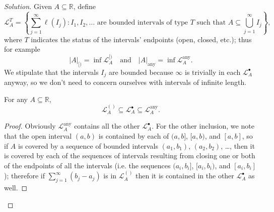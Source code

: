 \documentclass[11pt]{article}
\providecommand{\RR}{\mathbb R}
\newenvironment{soln}{\begin{proof}[Solution]}{\end{proof}}
\providecommand{\abs}[1]{\left|#1\right|}
\begin{document}
\begin{soln}
    Given $A\subseteq\RR$, define
    \begin{equation*}
	\mathcal L_A^{T} = \left\{ \sum_{j=1}^\infty \ell(I_j) :
	I_1, I_2, \dots \text{ are bounded intervals of type $T$ such that }
        A\subseteq\bigcup_{j=1}^\infty I_j\right\},
    \end{equation*}
    where $T$ indicates the status of the intervals' endpoints
    (open, closed, etc.); thus for example
    \begin{equation*}
	\abs{A}_{[)} = \inf\mathcal L_A^{[)}
	\quad\text{and}\quad
	\abs{A}_{\text{any}} = \inf\mathcal L_A^{\text{any}}.
    \end{equation*}
    We stipulate that the intervals $I_j$ are bounded
    because $\infty$ is trivially in each $\mathcal L_A^\bullet$ anyway,
    so we don't need to concern ourselves with intervals of infinite length.
    
    \begin{claim}
        \label{claim:om-ineqs}
	For any $A\subseteq\RR$,
	\begin{equation*}
	    \mathcal L_A^{()}\subseteq
	    \mathcal L_A^{\bullet}\subseteq\mathcal L_A^{\text{any}}.
	\end{equation*}
    \end{claim}

    \begin{proof}
	Obviously $\mathcal L_A^{\text{any}}$ contains
	all the other $\mathcal L_A^\bullet$.
	For the other inclusion, we note that the open interval $(a,b)$
	is contained by each of $(a,b]$, $[a,b)$, and $[a,b]$, so
	if $A$ is covered by a sequence of bounded intervals
	$(a_1, b_1)$, $(a_2, b_2)$, \dots, then
	it is covered by each of the sequences of intervals resulting from
	closing one or both of the endpoints of all the intervals
	(i.e. the sequences $(a_i, b_i]$, $[a_i, b_i)$, and $[a_i, b_i]$);
	therefore if $\sum_{j=1}^\infty (b_j - a_j)$ is in $\mathcal L_A^{()}$
	then it is contained in the other $\mathcal L_A^{\bullet}$ as well.
    \end{proof}
    

\end{soln}
\end{document}
